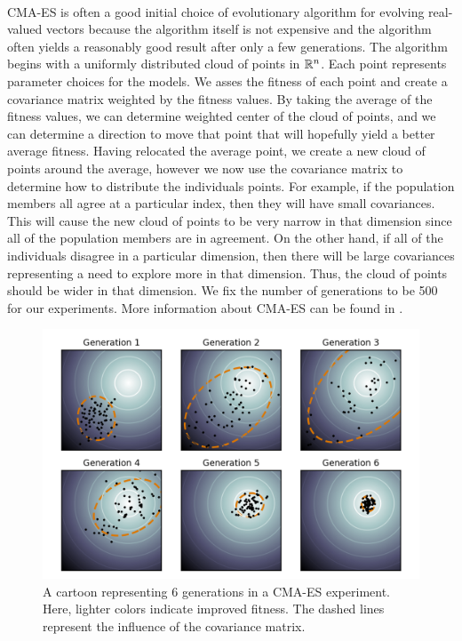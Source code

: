 \\
CMA-ES is often a good initial choice of evolutionary algorithm for evolving real-valued vectors because the algorithm itself is not expensive and the algorithm often yields a reasonably good result after only a few generations. The algorithm begins with a uniformly distributed cloud of points in $\mathbb{R}^{n}$. Each point represents parameter choices for the models. We asses the fitness of each point and create a covariance matrix weighted by the fitness values. By taking the average of the fitness values, we can determine weighted center of the cloud of points, and we can determine a direction to move that point that will hopefully yield a better average fitness. Having relocated the average point, we create a new cloud of points around the average, however we now use the covariance matrix to determine how to distribute the individuals points. For example, if the population members all agree at a particular index, then they will have small covariances. This will cause the new cloud of points to be very narrow in that dimension since all of the population members are in agreement. On the other hand, if all of the individuals disagree in a particular dimension, then there will be large covariances representing a need to explore more in that dimension. Thus, the cloud of points should be wider in that dimension. We fix the number of generations to be 500 for our experiments. More information about CMA-ES can be found in \cite{suttorp}.

\begin{figure}[tpb!]
\centering
  \includegraphics[width=.48\textwidth]{cmaes.png}
  \caption{
    A cartoon representing 6 generations in a CMA-ES experiment. Here, lighter colors indicate improved fitness. The dashed lines represent the influence of the covariance matrix.\\
    }
  \label{fig:cmaes}
\end{figure}


